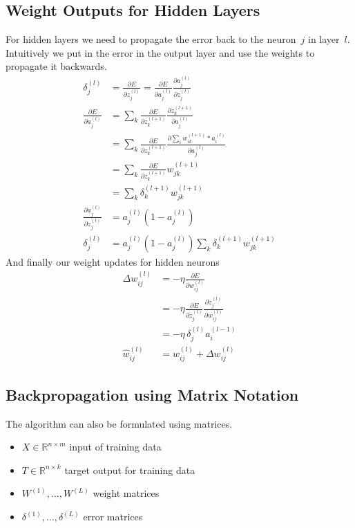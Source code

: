 \subsection{Weight Outputs for Hidden Layers}
For hidden layers we need to propagate the error back to the neuron~$j$ in layer~$l$. Intuitively we put in the error in the output layer and use the weights to propagate it backwards.
\begin{align}
\delta_j^{(l)} &= \frac{\partial E}{\partial z_j^{(l)}} = \frac{\partial E}{\partial a_j^{(l)}} \frac{\partial a_j^{(l)}}{\partial z_j^{(l)}}\\
\frac{\partial E}{\partial a_j^{(l)}}
&= \sum_k \frac{\partial E}{\partial z_k^{(l+1)}} \frac{\partial z_k^{(l+1)}}{\partial a_j^{(l)}}\\
&= \sum_k \frac{\partial E}{\partial z_k^{(l+1)}} \frac{\partial \sum_i w_{ik}^{(l+1)} * a_i^{(l)}}{\partial a_j^{(l)}}\\
&= \sum_k \frac{\partial E}{\partial z_k^{(l+1)}} w_{jk}^{(l+1)}\\
&= \sum_k \delta_k^{(l+1)} w_{jk}^{(l+1)}\\
\frac{\partial a_j^{(l)}}{\partial z_j^{(l)}} &= a_j^{(l)} (1 - a_j^{(l)}) \tag{sigmoid derivative}\\
\delta_j^{(l)} &= a_j^{(l)} (1 - a_j^{(l)}) \sum_k \delta_k^{(l+1)} w_{jk}^{(l+1)}
\end{align}
And finally our weight updates for hidden neurons
\begin{align}
\Delta w_{ij}^{(l)} &= - \eta \frac{\partial E}{\partial w_{ij}^{(l)}}\\
&= - \eta \frac{\partial E}{\partial z_j^{(l)}} \frac{\partial z_j^{(l)}}{\partial w_{ij}^{(l)}}\\
&= - \eta\, \delta_j^{(l)} a_i^{(l-1)}\\
\hat w_{ij}^{(l)} &= w_{ij}^{(l)} + \Delta w_{ij}^{(l)}
\end{align}


\subsection{Backpropagation using Matrix Notation}
The algorithm can also be formulated using matrices.
\begin{itemize}
\item $X \in \mathbb{R}^{n \times m}$ input of training data
\item $T \in \mathbb{R}^{n \times k}$ target output for training data
\item $W^{(1)},\dots,W^{(L)}$ weight matrices
\item $\delta^{(1)},\dots,\delta^{(L)}$ error matrices
\end{itemize}

